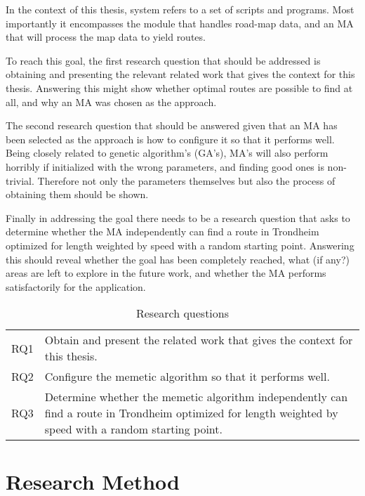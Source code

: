 In the context of this thesis, system refers to a set of scripts and programs. Most importantly it encompasses the module that handles road-map data, and an MA that will process the map data to yield routes.

To reach this goal, the first research question that should be addressed is obtaining and presenting the relevant related work that gives the context for this thesis. Answering this might show whether optimal routes are possible to find at all, and why an MA was chosen as the approach.

The second research question that should be answered given that an MA has been selected as the approach is how to configure it so that it performs well. Being closely related to genetic algorithm's (GA's), MA's will also perform horribly if initialized with the wrong parameters, and finding good ones is non-trivial. Therefore not only the parameters themselves but also the process of obtaining them should be shown.

Finally in addressing the goal there needs to be a research question that asks to determine whether the MA independently can find a route in Trondheim optimized for length weighted by speed with a random starting point. Answering this should reveal whether the goal has been completely reached, what (if any?) areas are left to explore in the future work, and whether the MA performs satisfactorily for the application.

\begin{table}[H]
\centering
\begin{tabular}{cp{}}
RQ1  &  Obtain and present the related work that gives the context for this thesis. \\
RQ2  &  Configure the memetic algorithm so that it performs well.\\
RQ3  &  Determine whether the memetic algorithm independently can find a route in Trondheim optimized for length weighted by speed with a random starting point. \\
\end{tabular}
\caption{Research questions}
\label{tab:research_questions}
\end{table}

\section{Research Method}

